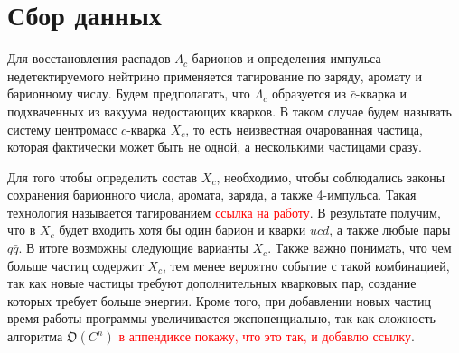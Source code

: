 \section{Сбор данных}

Для восстановления распадов $\Lambda_c$-барионов и определения импульса недетектируемого нейтрино применяется тагирование по заряду, аромату и барионному числу. Будем предполагать, что $\Lambda_c$ образуется из $\bar{c}$-кварка и подхваченных из вакуума недостающих кварков. В таком случае будем называть систему центромасс $c$-кварка $X_c$, то есть неизвестная очарованная частица, которая фактически может быть не одной, а несколькими частицами сразу.

\begin{figure}[h!]
    \centering
\end{figure}

Для того чтобы определить состав $X_c$, необходимо, чтобы соблюдались законы сохранения барионного числа, аромата, заряда, а также 4-импульса. Такая технология называется тагированием \textcolor{red}{ссылка на работу}. В результате получим, что в $X_c$ будет входить хотя бы один барион и кварки $u c d$, а также любые пары $q \bar{q}$. В итоге возможны следующие варианты $X_c$. Также важно понимать, что чем больше частиц содержит $X_c$, тем менее вероятно событие с такой комбинацией, так как новые частицы требуют дополнительных кварковых пар, создание которых требует больше энергии. Кроме того, при добавлении новых частиц время работы программы увеличивается экспоненциально, так как сложность алгоритма $\mathfrak{O}(C^n)$ \textcolor{red}{в аппендиксе покажу, что это так, и добавлю ссылку}.
